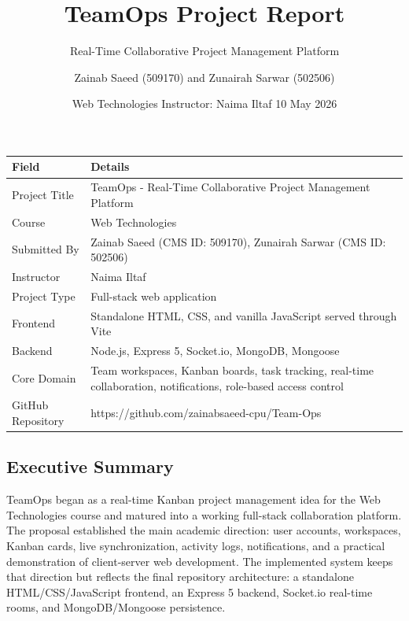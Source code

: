 \documentclass[
]{article}
\title{TeamOps Project Report}
\subtitle{Real-Time Collaborative Project Management Platform}
\author{Zainab Saeed (509170) and Zunairah Sarwar (502506)}
\date{Web Technologies \textbar{} Instructor: Naima Iltaf \textbar{} 10
May 2026}
\begin{document}
\maketitle

{\def\LTcaptype{} %
\begin{longtable}[]{@{}
  >{\raggedright\arraybackslash}p{}
  >{\raggedright\arraybackslash}p{}@{}}
\toprule\noalign{}
\begin{minipage}[b]{\linewidth}\raggedright
Field
\end{minipage} & \begin{minipage}[b]{\linewidth}\raggedright
Details
\end{minipage} \\
\midrule\noalign{}
\endhead
\bottomrule\noalign{}
\endlastfoot
Project Title & TeamOps - Real-Time Collaborative Project Management
Platform \\
Course & Web Technologies \\
Submitted By & Zainab Saeed (CMS ID: 509170), Zunairah Sarwar (CMS ID:
502506) \\
Instructor & Naima Iltaf \\
Project Type & Full-stack web application \\
Frontend & Standalone HTML, CSS, and vanilla JavaScript served through
Vite \\
Backend & Node.js, Express 5, Socket.io, MongoDB, Mongoose \\
Core Domain & Team workspaces, Kanban boards, task tracking, real-time
collaboration, notifications, role-based access control \\
GitHub Repository & https://github.com/zainabsaeed-cpu/Team-Ops \\
\end{longtable}
}

\subsection{Executive Summary}\label{executive-summary}

TeamOps began as a real-time Kanban project management idea for the Web
Technologies course and matured into a working full-stack collaboration
platform. The proposal established the main academic direction: user
accounts, workspaces, Kanban cards, live synchronization, activity logs,
notifications, and a practical demonstration of client-server web
development. The implemented system keeps that direction but reflects
the final repository architecture: a standalone HTML/CSS/JavaScript
frontend, an Express 5 backend, Socket.io real-time rooms, and
MongoDB/Mongoose persistence.
\end{document}

